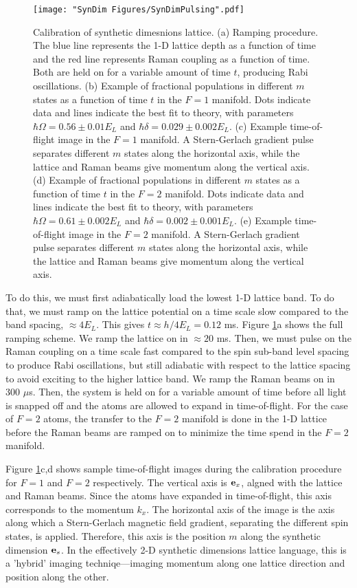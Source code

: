 \begin{figure}
	\texttt{[image: "SynDim Figures/SynDimPulsing".pdf]}
\caption[Calibration of synthetic dimesnions lattice]{Calibration of synthetic dimesnions lattice. (a) Ramping procedure. The blue line represents the 1-D lattice depth as a function of time and the red line represents Raman coupling as a function of time. Both are held on for a variable amount of time $t$, producing Rabi oscillations. (b) Example of fractional populations in different $m$ states as a function of time $t$ in the $F=1$ manifold. Dots indicate data and lines indicate the best fit to theory, with parameters $\hbar\Omega=0.56\pm0.01 E_L$ and $\hbar\delta = 0.029 \pm 0.002 E_L$. (c) Example time-of-flight image in the $F=1$ manifold. A Stern-Gerlach gradient pulse separates different $m$ states along the horizontal axis, while the lattice and Raman beams give momentum along the vertical axis. (d)  Example of fractional populations in different $m$ states as a function of time $t$ in the $F=2$ manifold. Dots indicate data and lines indicate the best fit to theory, with parameters $\hbar\Omega=0.61\pm0.002 E_L$ and $\hbar\delta = 0.002 \pm 0.001 E_L$. (e) Example time-of-flight image in the $F=2$ manifold. A Stern-Gerlach gradient pulse separates different $m$ states along the horizontal axis, while the lattice and Raman beams give momentum along the vertical axis.  }
\label{fig:SynDimPulsing}
\end{figure}

To do this, we must first adiabatically load the lowest 1-D lattice band. To do that, we must ramp on the lattice potential on a time scale slow compared to the band spacing, $\approx 4 E_L$. This gives $t\approx h/4E_L=0.12$ ms. Figure \ref{fig:SynDimPulsing}a shows the full ramping scheme. We ramp the lattice on in $\approx 20$ ms. Then, we must pulse on the Raman coupling on a time scale fast compared to the spin sub-band level spacing to produce Rabi oscillations, but still adiabatic with respect to the lattice spacing to avoid exciting to the higher lattice band. We ramp the Raman beams on in $300$ $\mu$s. Then, the system is held on for a variable amount of time before all light is snapped off and the atoms are allowed to expand in time-of-flight. For the case of $F=2$ atoms, the transfer to the $F=2$ manifold is done in the 1-D lattice before the Raman beams are ramped on to minimize the time spend in the $F=2$ manifold. 

Figure \ref{fig:SynDimPulsing}c,d shows sample time-of-flight images during the calibration procedure for $F=1$ and $F=2$ respectively. The vertical axis is ${\bf e}_x$, algned with the lattice and Raman beams. Since the atoms have expanded in time-of-flight, this axis corresponds to the momentum $k_x$. The horizontal axis of the image is the axis along which a Stern-Gerlach magnetic field gradient, separating the different spin states, is applied. Therefore, this axis is the position $m$ along the synthetic dimension ${\bf e}_s$. In the effectively 2-D synthetic dimensions lattice language, this is a 'hybrid' imaging techniqe---imaging momentum along one lattice direction and position along the other.  


